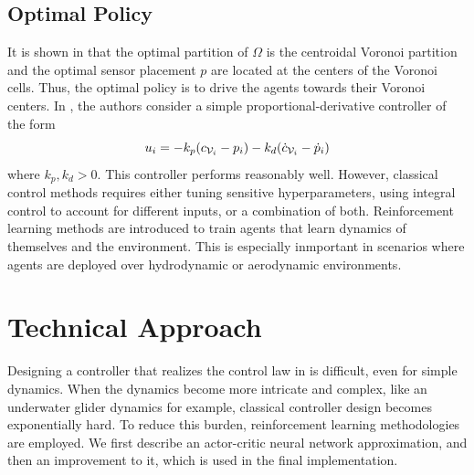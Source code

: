 \documentclass[10pt,conference]{IEEEtran}
\begin{document}
	\subsection{Optimal Policy}
		It is shown in \cite{Cortes:2004} that the optimal partition of $\Omega$ is the centroidal Voronoi partition and the optimal sensor placement $p$ are located at the centers of the Voronoi cells. Thus, the optimal policy is to drive the agents towards their Voronoi centers. In \cite{Cortes:2004}, the authors consider a simple proportional-derivative controller of the form
		\begin{equation*}
			\displaystyle u_i = -k_p (c_{\mathcal{V}_i} - p_i) - k_d(\dot{c}_{\mathcal{V}_i} - \dot{p}_i)
		\end{equation*}
		where $k_p, k_d > 0$. This controller performs reasonably well. However, classical control methods requires either tuning sensitive hyperparameters, using integral control to account for different inputs, or a combination of both. Reinforcement learning methods are introduced to train agents that learn dynamics of themselves and the environment. This is especially inmportant in scenarios where agents are deployed over hydrodynamic or aerodynamic environments.  
\section{Technical Approach}
	Designing a controller that realizes the control law in \cite{Cortes:2004} is difficult, even for simple dynamics. When the dynamics become more intricate and complex, like an underwater glider dynamics for example, classical controller design becomes exponentially hard. To reduce this burden, reinforcement learning methodologies are employed. We first describe an actor-critic neural network approximation, and then an improvement to it, which is used in the final implementation. 
\end{document}
